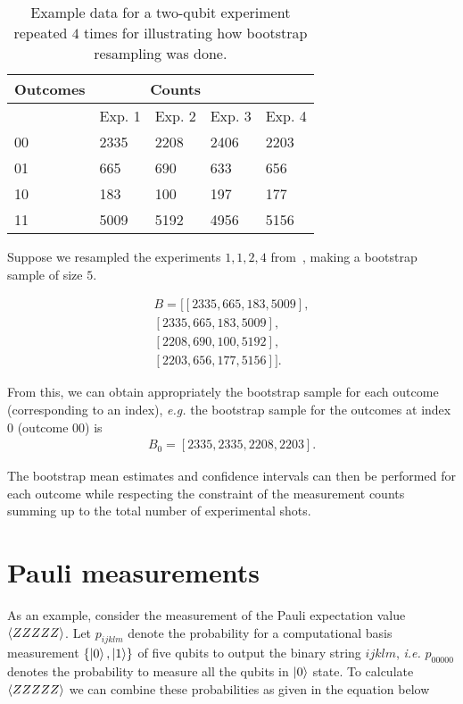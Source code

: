\begin{table}[hbt]
  \centering
  \selectfont
  \begin{tabular}{lllll}
    \toprule
    Outcomes & \multicolumn{3}{c}{Counts} \\
    \midrule
     & Exp. 1 & Exp. 2 & Exp. 3 & Exp. 4 \\
    \midrule
    00 & 2335 & 2208 & 2406 & 2203\\ 
    01 & 665  & 690  & 633  & 656 \\ 
    10 & 183  & 100  & 197  & 177 \\
    11 & 5009 & 5192 & 4956 & 5156 \\
    \bottomrule
  \end{tabular}
  \caption{
      Example data for a two-qubit experiment repeated $4$ times for illustrating how bootstrap resampling was done.
  }
\end{table}

\bigskip

\noindent
Suppose we resampled the experiments $1,1,2,4$ from~, making a bootstrap sample of size $5$.

\begin{align}
    B = [[2335, 665, 183, 5009], \nonumber \\
         [2335, 665, 183, 5009], \nonumber \\
         [2208, 690, 100, 5192],\nonumber \\
         [2203, 656, 177, 5156]].
\end{align}

\noindent
From this, we can obtain appropriately the bootstrap sample for each outcome (corresponding to an index), {\it e.g.} the bootstrap sample for the outcomes at index $0$ (outcome 00) is
\begin{align}
    B_{0} = [2335, 2335, 2208, 2203].
\end{align}

\noindent
The bootstrap mean estimates and confidence intervals can then be performed for each outcome while respecting the constraint of the measurement counts summing up to the total number of experimental shots.

\section{Pauli measurements}

As an example, consider the measurement of the Pauli expectation value $\expval{ZZZZZ}$. Let $p_{ijklm}$ denote the probability for a computational basis measurement $\{\ket{0}, \ket{1}\}$ of five qubits to output the binary string $ijklm$, {\it i.e.} $p_{00000}$ denotes the probability to measure all the qubits in $\ket{0}$ state. To calculate $\expval{ZZZZZ}$ we can combine these probabilities as given in the equation below

